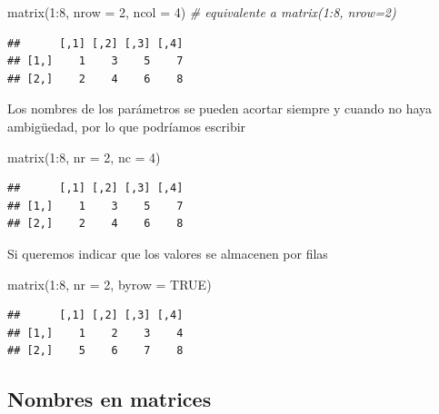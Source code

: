 \documentclass[
]{book}
\newenvironment{Shaded}{\begin{snugshade}}{\end{snugshade}}
\newcommand{\AttributeTok}[1]{\textcolor[rgb]{0.77,0.63,0.00}{#1}}
\newcommand{\CommentTok}[1]{\textcolor[rgb]{0.56,0.35,0.01}{\textit{#1}}}
\newcommand{\ConstantTok}[1]{\textcolor[rgb]{0.00,0.00,0.00}{#1}}
\newcommand{\DecValTok}[1]{\textcolor[rgb]{0.00,0.00,0.81}{#1}}
\newcommand{\FunctionTok}[1]{\textcolor[rgb]{0.00,0.00,0.00}{#1}}
\newcommand{\NormalTok}[1]{#1}
\newcommand{\SpecialCharTok}[1]{\textcolor[rgb]{0.00,0.00,0.00}{#1}}
\theoremstyle{break}
\theoremstyle{nonumberplain}
\begin{document}
\begin{Shaded}
\begin{Highlighting}[]
\FunctionTok{matrix}\NormalTok{(}\DecValTok{1}\SpecialCharTok{:}\DecValTok{8}\NormalTok{, }\AttributeTok{nrow =} \DecValTok{2}\NormalTok{, }\AttributeTok{ncol =} \DecValTok{4}\NormalTok{)  }\CommentTok{\# equivalente a matrix(1:8, nrow=2)}
\end{Highlighting}
\end{Shaded}

\begin{verbatim}
##      [,1] [,2] [,3] [,4]
## [1,]    1    3    5    7
## [2,]    2    4    6    8
\end{verbatim}

Los nombres de los parámetros se pueden acortar siempre y cuando no haya ambigüedad, por lo que podríamos escribir

\begin{Shaded}
\begin{Highlighting}[]
\FunctionTok{matrix}\NormalTok{(}\DecValTok{1}\SpecialCharTok{:}\DecValTok{8}\NormalTok{, }\AttributeTok{nr =} \DecValTok{2}\NormalTok{, }\AttributeTok{nc =} \DecValTok{4}\NormalTok{)}
\end{Highlighting}
\end{Shaded}

\begin{verbatim}
##      [,1] [,2] [,3] [,4]
## [1,]    1    3    5    7
## [2,]    2    4    6    8
\end{verbatim}

Si queremos indicar que los valores se almacenen por filas

\begin{Shaded}
\begin{Highlighting}[]
\FunctionTok{matrix}\NormalTok{(}\DecValTok{1}\SpecialCharTok{:}\DecValTok{8}\NormalTok{, }\AttributeTok{nr =} \DecValTok{2}\NormalTok{, }\AttributeTok{byrow =} \ConstantTok{TRUE}\NormalTok{)}
\end{Highlighting}
\end{Shaded}

\begin{verbatim}
##      [,1] [,2] [,3] [,4]
## [1,]    1    2    3    4
## [2,]    5    6    7    8
\end{verbatim}

\hypertarget{nombres-en-matrices}{%
\subsection{Nombres en matrices}\label{nombres-en-matrices}}
\end{document}
